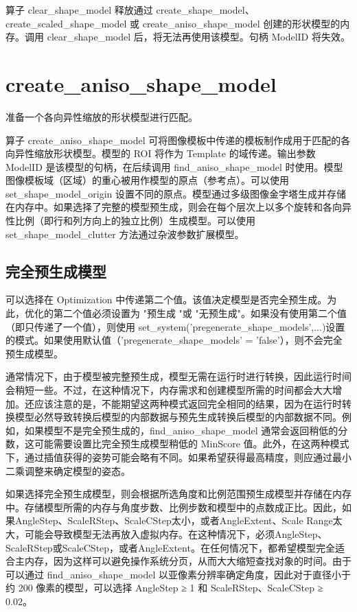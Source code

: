 \documentclass{article}
\begin{document}
算子 clear\_shape\_model 释放通过 create\_shape\_model、create\_scaled\_shape\_model 或 create\_aniso\_shape\_model 创建的形状模型的内存。调用 clear\_shape\_model 后，将无法再使用该模型。句柄 ModelID 将失效。

\section{create\_aniso\_shape\_model}
准备一个各向异性缩放的形状模型进行匹配。

算子 create\_aniso\_shape\_model 可将图像模板中传递的模板制作成用于匹配的各向异性缩放形状模型。模型的 ROI 将作为 Template 的域传递。输出参数 ModelID 是该模型的句柄，在后续调用 find\_aniso\_shape\_model 时使用。模型图像模板域（区域）的重心被用作模型的原点（参考点）。可以使用 set\_shape\_model\_origin 设置不同的原点。模型通过多级图像金字塔生成并存储在内存中。如果选择了完整的模型预生成，则会在每个层次上以多个旋转和各向异性比例（即行和列方向上的独立比例）生成模型。可以使用 set\_shape\_model\_clutter 方法通过杂波参数扩展模型。

\subsection{完全预生成模型}
可以选择在 Optimization 中传递第二个值。该值决定模型是否完全预生成。为此，优化的第二个值必须设置为 "预生成 "或 "无预生成"。如果没有使用第二个值（即只传递了一个值），则使用 set\_system('pregenerate\_shape\_models',...)设置的模式。如果使用默认值（'pregenerate\_shape\_models' = 'false'），则不会完全预生成模型。

通常情况下，由于模型被完整预生成，模型无需在运行时进行转换，因此运行时间会稍短一些。不过，在这种情况下，内存需求和创建模型所需的时间都会大大增加。还应该注意的是，不能期望这两种模式返回完全相同的结果，因为在运行时转换模型必然导致转换后模型的内部数据与预先生成转换后模型的内部数据不同。例如，如果模型不是完全预生成的，find\_aniso\_shape\_model 通常会返回稍低的分数，这可能需要设置比完全预生成模型稍低的 MinScore 值。此外，在这两种模式下，通过插值获得的姿势可能会略有不同。如果希望获得最高精度，则应通过最小二乘调整来确定模型的姿态。

如果选择完全预生成模型，则会根据所选角度和比例范围预生成模型并存储在内存中。存储模型所需的内存与角度步数、比例步数和模型中的点数成正比。因此，如果AngleStep、ScaleRStep、ScaleCStep太小，或者AngleExtent、Scale Range太大，可能会导致模型无法再放入虚拟内存。在这种情况下，必须AngleStep、ScaleRStep或ScaleCStep，或者AngleExtent。在任何情况下，都希望模型完全适合主内存，因为这样可以避免操作系统分页，从而大大缩短查找对象的时间。由于可以通过 find\_aniso\_shape\_model 以亚像素分辨率确定角度，因此对于直径小于约 200 像素的模型，可以选择 AngleStep ≥ 1 和 ScaleRStep、ScaleCStep ≥ 0.02。
\end{document}
